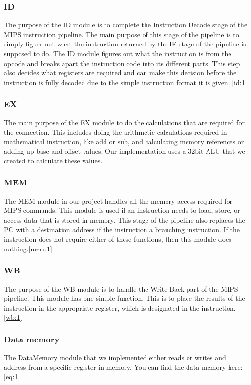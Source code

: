 \documentclass{llncs}
\begin{document}
\subsubsection{ID}
The purpose of the ID module is to complete the Instruction Decode stage of the MIPS instruction pipeline. The main purpose of this stage of the pipeline is to simply figure out what the instruction returned by the IF stage of the pipeline is supposed to do. The ID module figures out what the instruction is from the opcode and breaks apart the instruction code into its different parts. This step also decides what registers are required and can make this decision before the instruction is fully decoded due to the simple instruction format it is given. \ref{id:1}
\subsubsection{EX}
The main purpose of the EX module to do the calculations that are required for the connection. This includes doing the arithmetic calculations required in mathematical instruction, like add or sub, and calculating memory references or adding up base and offset values. Our implementation uses a 32bit ALU that we created to calculate these values. 

\subsubsection{MEM}
The MEM module in our project handles all the memory access required for MIPS commands. This module is used if an instruction needs to load, store, or access data that is stored in memory. This stage of the pipeline also replaces the PC with a destination address if the instruction a branching instruction. If the instruction does not require either of these functions, then this module does nothing.\ref{mem:1}

\subsubsection{WB}
The purpose of the WB module is to handle the Write Back part of the MIPS pipeline. This module has one simple function. This is to place the results of the instruction in the appropriate register, which is designated in the instruction. \ref{wb:1}

\subsubsection{Data memory}
The DataMemory module that we implemented either reads or writes and address from a specific register in memory. You can find the data memory here: \ref{eq:1} 
\end{document}
